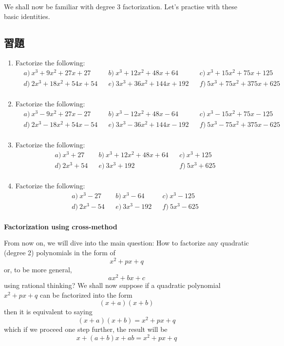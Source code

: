 \documentclass[12pt]{article}
\begin{document}
    We shall now be familiar with degree 3 factorization. Let's practise with these basic identities.

    \subsection*{習題}
    \begin{enumerate}
        \item Factorize the following:\begin{align*}
            &a)\ x^3+9x^2+27x+27&&b)\ x^3+12x^2+48x+64&&c)\ x^3+15x^2+75x+125\\
            &d)\ 2x^3+18x^2+54x+54&&e)\ 3x^3+36x^2+144x+192&&f)\ 5x^3+75x^2+375x+625\\
        \end{align*}
        \item Factorize the following:\begin{align*}
            &a)\ x^3-9x^2+27x-27&&b)\ x^3-12x^2+48x-64&&c)\ x^3-15x^2+75x-125\\
            &d)\ 2x^3-18x^2+54x-54&&e)\ 3x^3-36x^2+144x-192&&f)\ 5x^3-75x^2+375x-625\\
        \end{align*}
        \item Factorize the following:\begin{align*}
            &a)\ x^3+27&&b)\ x^3+12x^2+48x+64&&c)\ x^3+125\\
            &d)\ 2x^3+54&&e)\ 3x^3+192&&f)\ 5x^3+625\\
        \end{align*}
        \item Factorize the following:\begin{align*}
            &a)\ x^3-27&&b)\ x^3-64&&c)\ x^3-125\\
            &d)\ 2x^3-54&&e)\ 3x^3-192&&f)\ 5x^3-625\\
        \end{align*}
    \end{enumerate}

    \begin{center}
        \textbf{Factorization using cross-method}
    \end{center}

    From now on, we will dive into the main question: How to factorize any quadratic (degree 2) polynomials in the form of $$x^2+px+q$$ or, to be more general, $$ax^2+bx+c$$ using rational thinking? We shall now suppose if a quadratic polynomial $x^2+px+q$ can be factorized into the form $$(x+a)(x+b)$$ then it is equivalent to saying $$(x+a)(x+b)=x^2+px+q$$ which if we proceed one step further, the result will be $$x+(a+b)x+ab=x^2+px+q$$
\end{document}
